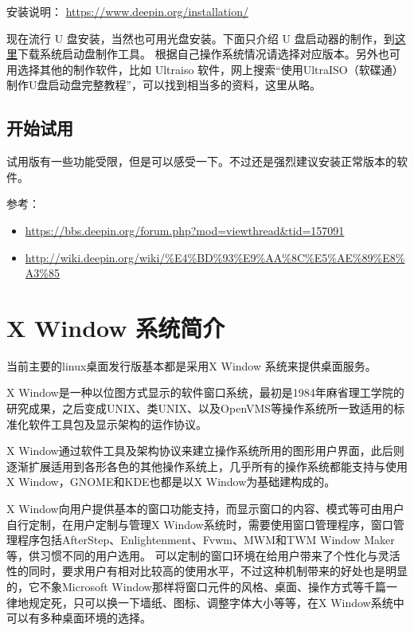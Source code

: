 \documentclass[doctor,openright,twoside]{sjtuthesis}
\providecommand{\tightlist}{%
    \setlength{\itemsep}{0pt}\setlength{\parskip}{0pt}}
\theoremstyle{plain}
\theoremstyle{definition}
\theoremstyle{remark}
\theoremstyle{ocrenumbox}
\theoremstyle{plain}
\newcommand\cqh{“}
\newcommand\cqt{”}
\begin{document}
安装说明： \url{https://www.deepin.org/installation/}

现在流行 U 盘安装，当然也可用光盘安装。下面只介绍 U
盘启动器的制作，到\href{https://www.deepin.org/original/deepin-boot-maker/}{这里}下载系统启动盘制作工具。
根据自己操作系统情况请选择对应版本。另外也可用选择其他的制作软件，比如
Ultraiso
软件，网上搜索\cqh 使用UltraISO（软碟通）制作U盘启动盘完整教程\cqt ，可以找到相当多的资料，这里从略。

\subsection{开始试用}

试用版有一些功能受限，但是可以感受一下。不过还是强烈建议安装正常版本的软件。

参考：

\begin{itemize}
\tightlist
\item
  \url{https://bbs.deepin.org/forum.php?mod=viewthread\&tid=157091}
\item
  \url{http://wiki.deepin.org/wiki/\%E4\%BD\%93\%E9\%AA\%8C\%E5\%AE\%89\%E8\%A3\%85}
\end{itemize}

\hypertarget{x-window-}{%
\section{X Window 系统简介}\label{x-window-}}

当前主要的linux桌面发行版基本都是采用X Window 系统来提供桌面服务。

X
Window是一种以位图方式显示的软件窗口系统，最初是1984年麻省理工学院的研究成果，之后变成UNIX、类UNIX、以及OpenVMS等操作系统所一致适用的标准化软件工具包及显示架构的运作协议。

X
Window通过软件工具及架构协议来建立操作系统所用的图形用户界面，此后则逐渐扩展适用到各形各色的其他操作系统上，几乎所有的操作系统都能支持与使用X
Window，GNOME和KDE也都是以X Window为基础建构成的。

X
Window向用户提供基本的窗口功能支持，而显示窗口的内容、模式等可由用户自行定制，在用户定制与管理X
Window系统时，需要使用窗口管理程序，窗口管理程序包括AfterStep、Enlightenment、Fvwm、MWM和TWM
Window Maker等，供习惯不同的用户选用。
可以定制的窗口环境在给用户带来了个性化与灵活性的同时，要求用户有相对比较高的使用水平，不过这种机制带来的好处也是明显的，它不象Microsoft
Window那样将窗口元件的风格、桌面、操作方式等千篇一律地规定死，只可以换一下墙纸、图标、调整字体大小等等，在X
Window系统中可以有多种桌面环境的选择。
\end{document}
